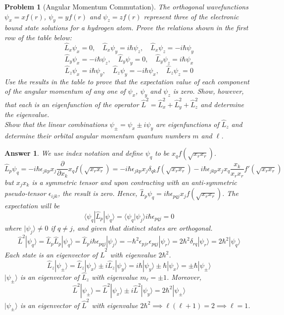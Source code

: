 \documentclass[a4paper]{article}
\newtheorem{ans}{Answer}[section]
\theoremstyle{new}
\newtheorem{qns}{Problem}[section]
\begin{document}
\begin{qns}[Angular Momentum Commutation]
The orthogonal wavefunctions $\psi_x=xf(r)$, $\psi_y=yf(r)$ and  $\psi_z=zf(r)$ represent three of the electronic bound state solutions for a hydrogen atom. Prove the relations shown in
the first row of the table below:
$$\hat{L}_x\psi_x=0,\quad\hat{L}_x\psi_y=i\hbar\psi_z,\quad\hat{L}_x\psi_z=-i\hbar\psi_y$$
$$\hat{L}_y\psi_x=-i\hbar\psi_z,\quad\hat{L}_y\psi_y=0,\quad\hat{L}_y\psi_z=i\hbar\psi_x$$
$$\hat{L}_z\psi_x=i\hbar\psi_y,\quad\hat{L}_z\psi_y=-i\hbar\psi_x,\quad\hat{L}_z\psi_z=0$$
Use the results in the table to prove that the expectation value of each component of the angular momentum of any one of $\psi_x$, $\psi_y$ and $\psi_z$ is zero. Show, however, that each is an eigenfunction of the operator $\hat{L}^2=\hat{L}_x^2+\hat{L}_y^2+\hat{L}_z^2$ and determine the eigenvalue.\\[5pt]
Show that the linear combinations $\psi_\pm=\psi_x\pm i\psi_y$ are eigenfunctions of $\hat{L}_z$ and determine their orbital angular momentum quantum numbers $m$ and $\ell$.
\end{qns}
\begin{ans}
We use index notation and define $\psi_q$ to be $x_qf(\sqrt{x_rx_r})$.
$$\hat{L}_p\psi_q=-i\hbar\epsilon_{jkp}x_j\frac{\partial}{\partial x_k}x_qf(\sqrt{x_rx_r})=-i\hbar\epsilon_{jkp}x_j\delta_{qk}f(\sqrt{x_rx_r})-i\hbar\epsilon_{jkp}x_jx_q\frac{x_k}{x_rx_r}f'(\sqrt{x_rx_r})$$
but $x_jx_k$ is a symmetric tensor and upon contracting with an anti-symmetric pseudo-tensor $\epsilon_{ijk}$, the result is zero. Hence, $\hat{L}_p\psi_q=i\hbar\epsilon_{pqj}x_jf(\sqrt{x_rx_r})$. The expectation will be
$$\langle\psi_q|\hat{L}_p|\psi_q\rangle=\langle\psi_q|\psi_j\rangle i\hbar\epsilon_{pqj}=0$$
where $|\psi_j\rangle\neq0$ if $q\neq j$, and given that distinct states are orthogonal.
$$\hat{L}^2|\psi_q\rangle=\hat{L}_p\hat{L}_p|\psi_q\rangle=\hat{L}_pi\hbar\epsilon_{pqj}|\psi_j\rangle=-\hbar^2\epsilon_{pjr}\epsilon_{pqj}|\psi_r\rangle=2\hbar^2\delta_{rq}|\psi_r\rangle=2\hbar^2|\psi_q\rangle$$
Each state is an eigenvector of $\hat{L}^2$ with eigenvalue $2\hbar^2$.
$$\hat{L}_z|\psi_\pm\rangle=\hat{L}_z|\psi_x\rangle\pm i\hat{L}_z|\psi_y\rangle=i\hbar|\psi_y\rangle\pm\hbar|\psi_x\rangle=\pm\hbar|\psi_\pm\rangle$$
$|\psi_\pm\rangle$ is an eigenvector of $\hat{L}_z$ with eigenvalue $m_\ell=\pm 1$. Moreover,
$$\hat{L}^2|\psi_\pm\rangle=\hat{L}^2|\psi_x\rangle\pm i\hat{L}^2|\psi_y\rangle=2\hbar^2|\psi_\pm\rangle$$
$|\psi_\pm\rangle$ is an eigenvector of $\hat{L}^2$ with eigenvalue $2\hbar^2\implies \ell(\ell+1)=2\implies\ell=1$.
\end{ans}
\end{document}
